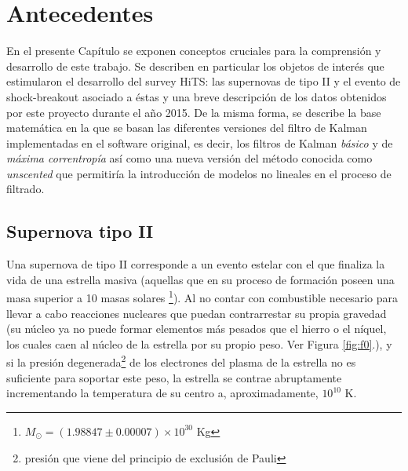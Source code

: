 \chapter{Antecedentes}
\label{ch:background}
En el presente Cap\'itulo se exponen conceptos cruciales para la comprensi\'on y desarrollo de este trabajo. Se describen en particular los objetos de inter\'es que estimularon el desarrollo del survey HiTS: las supernovas de tipo II y el evento de shock-breakout asociado a \'estas y una breve descripci\'on de los datos obtenidos por este proyecto durante el a\~no 2015. De la misma forma, se describe la base matem\'atica en la que se basan las diferentes versiones del filtro de Kalman implementadas en el software original, es decir, los filtros de Kalman \textit{b\'asico} y de \textit{m\'axima correntrop\'ia} as\'i como una nueva versi\'on del m\'etodo conocida como \textit{unscented} que permitir\'ia la introducci\'on de modelos no lineales en el proceso de filtrado.  

\section{Supernova tipo II}\label{sec:sn}
Una supernova de tipo II corresponde a un evento estelar con el que finaliza la vida de una estrella masiva (aquellas que en su proceso de formaci\'on poseen una masa superior a 10 masas solares \footnote{$M_{\odot} = (1.98847 \pm 0.00007) \times 10^{30}$ Kg}). Al no contar con combustible necesario para llevar a cabo reacciones nucleares que puedan contrarrestar su propia gravedad (su n\'ucleo ya no puede formar elementos m\'as pesados que el hierro o el n\'iquel, los cuales caen al n\'ucleo de la estrella por su propio peso. Ver Figura \ref{fig:f0}.), y si la presi\'on degenerada\footnote{presi\'on que viene del principio de exclusi\'on de Pauli} de los electrones del plasma de la estrella no es suficiente para soportar este peso, la estrella se contrae abruptamente incrementando la temperatura de su centro a, aproximadamente, $10^{10}$ K.
\bigskip

